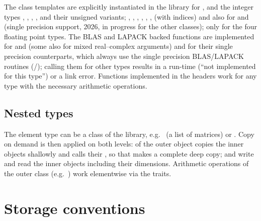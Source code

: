 The class templates are explicitly instantiated in the library for , 
and the integer types , , , ,  and their unsigned
variants; , , , , , ,  (with  indices) and  also for  and
 (single precision support, 2026, in progress for the other classes);  only for the four floating point types. The BLAS and LAPACK backed
functions are implemented for  and  (some also for mixed real--complex arguments)
and for their single precision counterparts, which always use the single precision BLAS/LAPACK routines (/); calling them for other types results in a run-time
 (``not implemented for this type'') or a link error. Functions implemented in the headers work
for any type with the necessary arithmetic operations.

\subsection{Nested types}

The element type can be a class of the library, e.g.\  (a list of matrices) or
. Copy on demand is then applied on both levels:  of the outer
object copies the inner objects shallowly and calls their , so that \code{|=} makes a
complete deep copy;  and  write and read the inner objects including their dimensions.
Arithmetic operations of the outer class (e.g.\ ) work elementwise via the traits.

\section{Storage conventions}\label{sec:concepts:storage}

